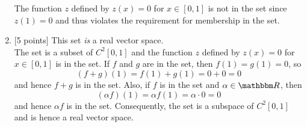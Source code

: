 \begin{solution}
\begin{enumerate}
The function $z$ defined by $z(x)=0$ for $x\in[0,1]$ is not in the set since $z(1)=0$ and thus violates the requirement for membership in the set.
\\
\item {[5 points]} This set \emph{is} a real vector space.\\
The set is a subset of $C^2[0,1]$ and the function $z$ defined by $z(x)=0$ for $x\in[0,1]$ is in the set. If $f$ and $g$ are in the set, then $f(1)=g(1)=0$, so
\[
(f+g)(1) = f(1)+g(1) = 0+0 = 0
\]
and hence $f+g$ is in the set. Also, if $f$ is in the set and $\alpha\in\R$, then
\[
(\alpha f)(1) = \alpha f(1) = \alpha\cdot 0 = 0
\]
and hence $\alpha f$ is in the set. Consequently, the set is a subspace of $C^2[0,1]$ and is hence a real vector space.
       
\end{enumerate}
\end{solution}